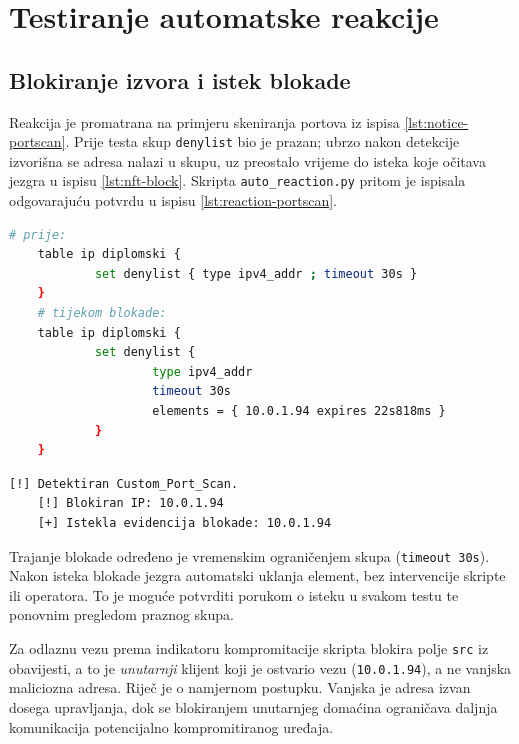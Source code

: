 \section{Testiranje automatske reakcije}

\subsection{Blokiranje izvora i istek blokade}

Reakcija je promatrana na primjeru skeniranja portova iz ispisa \ref{lst:notice-portscan}. Prije testa skup \texttt{denylist} bio je
prazan; ubrzo nakon detekcije izvorišna se adresa nalazi u skupu, uz preostalo vrijeme do isteka koje očitava jezgra u ispisu \ref{lst:nft-block}. Skripta
\texttt{auto\_reaction.py} pritom je ispisala odgovarajuću potvrdu u ispisu \ref{lst:reaction-portscan}.

\begin{lstlisting}[language=bash, caption={Skup \texttt{denylist} prije i tijekom blokade}, label={lst:nft-block}]
    # prije:
    table ip diplomski {
            set denylist { type ipv4_addr ; timeout 30s }
    }
    # tijekom blokade:
    table ip diplomski {
            set denylist {
                    type ipv4_addr
                    timeout 30s
                    elements = { 10.0.1.94 expires 22s818ms }
            }
    }
\end{lstlisting}

\begin{lstlisting}[caption={Ispis skripte \texttt{auto\_reaction.py}},
    label={lst:reaction-portscan}]
    [!] Detektiran Custom_Port_Scan.
    [!] Blokiran IP: 10.0.1.94
    [+] Istekla evidencija blokade: 10.0.1.94
\end{lstlisting}

Trajanje blokade određeno je vremenskim ograničenjem skupa (\texttt{timeout 30s}). Nakon isteka
blokade jezgra automatski uklanja element, bez intervencije skripte ili operatora. To je moguće potvrditi porukom o isteku u svakom testu te ponovnim pregledom praznog skupa.

Za odlaznu vezu prema indikatoru kompromitacije skripta blokira polje \texttt{src} iz obavijesti, a to je \emph{unutarnji} klijent koji je ostvario
vezu (\texttt{10.0.1.94}), a ne vanjska maliciozna adresa. Riječ je o namjernom postupku. Vanjska je adresa izvan dosega upravljanja, dok se
blokiranjem unutarnjeg domaćina ograničava daljnja komunikacija potencijalno kompromitiranog uređaja.

